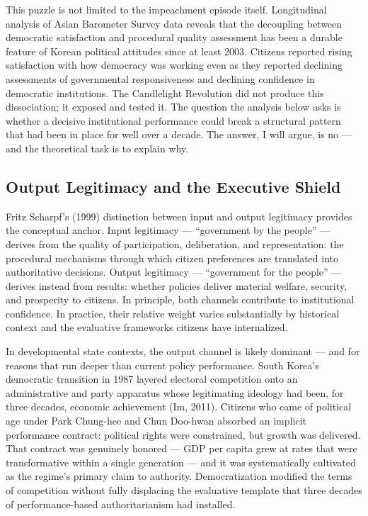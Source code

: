 \documentclass[
  12pt,
  letterpaper]{article}
\begin{document}
This puzzle is not limited to the impeachment episode itself.
Longitudinal analysis of Asian Barometer Survey data reveals that the
decoupling between democratic satisfaction and procedural quality
assessment has been a durable feature of Korean political attitudes
since at least 2003. Citizens reported rising satisfaction with how
democracy was working even as they reported declining assessments of
governmental responsiveness and declining confidence in democratic
institutions. The Candlelight Revolution did not produce this
dissociation; it exposed and tested it. The question the analysis below
asks is whether a decisive institutional performance could break a
structural pattern that had been in place for well over a decade. The
answer, I will argue, is no --- and the theoretical task is to explain
why.

\subsection{Output Legitimacy and the Executive
Shield}\label{output-legitimacy-and-the-executive-shield}

Fritz Scharpf's (1999) distinction between input and output legitimacy
provides the conceptual anchor. Input legitimacy --- ``government by the
people'' --- derives from the quality of participation, deliberation,
and representation: the procedural mechanisms through which citizen
preferences are translated into authoritative decisions. Output
legitimacy --- ``government for the people'' --- derives instead from
results: whether policies deliver material welfare, security, and
prosperity to citizens. In principle, both channels contribute to
institutional confidence. In practice, their relative weight varies
substantially by historical context and the evaluative frameworks
citizens have internalized.

In developmental state contexts, the output channel is likely dominant
--- and for reasons that run deeper than current policy performance.
South Korea's democratic transition in 1987 layered electoral
competition onto an administrative and party apparatus whose
legitimating ideology had been, for three decades, economic achievement
(Im, 2011). Citizens who came of political age under Park Chung-hee and
Chun Doo-hwan absorbed an implicit performance contract: political
rights were constrained, but growth was delivered. That contract was
genuinely honored --- GDP per capita grew at rates that were
transformative within a single generation --- and it was systematically
cultivated as the regime's primary claim to authority. Democratization
modified the terms of competition without fully displacing the
evaluative template that three decades of performance-based
authoritarianism had installed.
\end{document}
